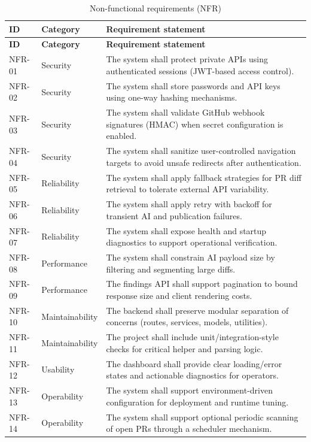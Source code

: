 \begin{longtable}{p{}p{}p{}}
\caption{Non-functional requirements (NFR)}\label{tab:nfr}\\
\toprule
\textbf{ID} & \textbf{Category} & \textbf{Requirement statement} \\
\midrule
\endfirsthead
\toprule
\textbf{ID} & \textbf{Category} & \textbf{Requirement statement} \\
\midrule
\endhead
\bottomrule
\endfoot
NFR-01 & Security & The system shall protect private APIs using authenticated sessions (JWT-based access control). \\
NFR-02 & Security & The system shall store passwords and API keys using one-way hashing mechanisms. \\
NFR-03 & Security & The system shall validate GitHub webhook signatures (HMAC) when secret configuration is enabled. \\
NFR-04 & Security & The system shall sanitize user-controlled navigation targets to avoid unsafe redirects after authentication. \\
NFR-05 & Reliability & The system shall apply fallback strategies for PR diff retrieval to tolerate external API variability. \\
NFR-06 & Reliability & The system shall apply retry with backoff for transient AI and publication failures. \\
NFR-07 & Reliability & The system shall expose health and startup diagnostics to support operational verification. \\
NFR-08 & Performance & The system shall constrain AI payload size by filtering and segmenting large diffs. \\
NFR-09 & Performance & The findings API shall support pagination to bound response size and client rendering costs. \\
NFR-10 & Maintainability & The backend shall preserve modular separation of concerns (routes, services, models, utilities). \\
NFR-11 & Maintainability & The project shall include unit/integration-style checks for critical helper and parsing logic. \\
NFR-12 & Usability & The dashboard shall provide clear loading/error states and actionable diagnostics for operators. \\
NFR-13 & Operability & The system shall support environment-driven configuration for deployment and runtime tuning. \\
NFR-14 & Operability & The system shall support optional periodic scanning of open PRs through a scheduler mechanism. \\
\end{longtable}


